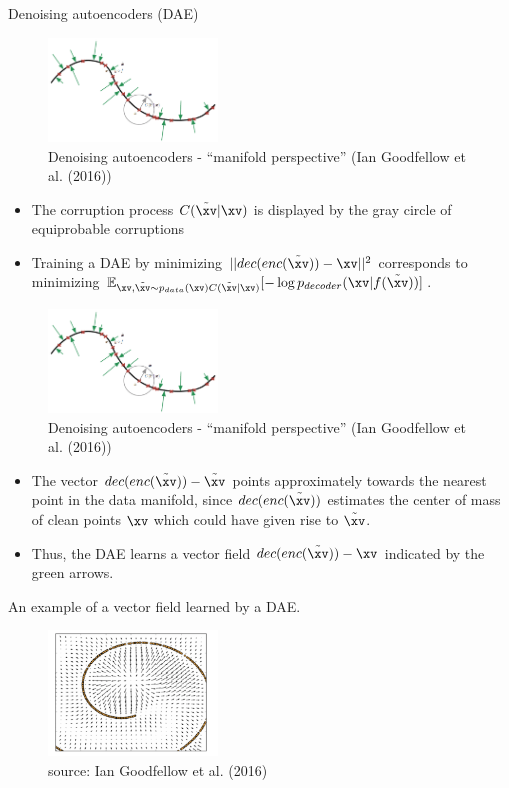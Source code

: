 \begin{vbframe}{Denoising autoencoders (DAE)}
\begin{figure}
    \centering
    \includegraphics[width=4.5cm]{plots/denoising_autoencoder.png}
    \caption{Denoising autoencoders - \enquote{manifold perspective} (Ian Goodfellow et al. (2016))}
  \end{figure}
  \begin{itemize}
    \item The corruption process $C(\tilde{\xv}|\xv)$ is displayed by the gray circle of equiprobable corruptions
    \item Training a DAE  by minimizing  $||dec(enc(\tilde{\xv})) - \xv||^2$ corresponds to minimizing $
    \mathbb{E}_{\xv,\tilde{\xv}\sim p_{data}(\xv)C(\tilde{\xv}|\xv)}[- \log p_{decoder}(\xv|f(\tilde{\xv}))]$.
  \end{itemize}
\framebreak
\begin{figure}
    \centering
    \includegraphics[width=4.5cm]{plots/denoising_autoencoder.png}
    \caption{Denoising autoencoders - \enquote{manifold perspective} (Ian Goodfellow et al. (2016))}
  \end{figure}
  \begin{itemize}
 
    \item The vector $dec(enc(\tilde{\xv})) - \tilde{\xv}$ points approximately towards the nearest point in the  data manifold, since $dec(enc(\tilde{\xv}))$ estimates the center of mass of clean points $\xv$ which could have given rise to $\tilde{\xv}$.
    \item Thus, the DAE learns a vector field $dec(enc(\tilde\xv)) - \xv$ indicated by the green arrows.
  \end{itemize}
  
\framebreak

An example of a vector field learned by a DAE. 
  
  \begin{figure}
    \centering
    \includegraphics[width=4.5cm]{plots/DAE-vectorfield.png}
    \caption{ source: Ian Goodfellow et al. (2016)}
  \end{figure}
  
  
\end{vbframe}
